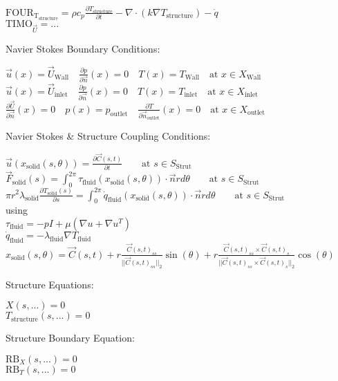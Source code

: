 \documentclass[10pt]{article} %
\begin{document}
\begin{center}
	$\text{FOUR}_{\text{T}_{\text{structure}}} = \rho c_p \frac{\partial T_{\text{structure}}}{\partial t} - \nabla \cdot (k\nabla T_{\text{structure}}) - \dot q$\\
	$\text{TIMO}_{\vec{U}} = ...$\\
\begin{flushleft}
	Navier Stokes Boundary Conditions:
\end{flushleft}
	$\vec{u}(x)=\vec{U}_{\text{Wall}} \quad \frac{\partial p}{\partial \vec{n}}(x)=0 \quad  T(x) = T_{\text{Wall}} \quad  \text{at } x \in X_{\text{Wall}}$\\
	$\vec{u}(x)=\vec{U}_{\text{inlet}} \quad \frac{\partial p}{\partial \vec{n}}(x)=0 \quad  T(x) = T_{\text{inlet}} \quad \text{at } x \in X_{\text{inlet}}$\\
	$\frac{\partial \vec{U}}{\partial \vec{n}}(x) = 0\quad p(x)=p_{\text{outlet}} \quad  \frac{\partial T}{\partial \vec{n}_{\text{outlet}}}(x) = 0 \quad \text{at } x \in X_{\text{outlet}}$\\
\begin{flushleft}
	Navier Stokes \& Structure Coupling Conditions:
\end{flushleft}
	$\vec{u}(x_{\text{solid}}\left(s,\theta\right))= \frac{\partial \vec{C}(s,t)}{\partial t} \quad \quad \text{at } s \in S_{\text{Strut}}$\\
	$ \vec{F}_{\text{solid}}(s) = \int_0^{2\pi} \tau_{\text{fluid}}(x_{\text{solid}}(s,\theta)) \cdot \vec{n} r d\theta \quad  \quad \text{at } s \in S_{\text{Strut}}$\\
	$ \pi r^2 \lambda_{\text{solid}} \frac{\partial T_{\text{solid}}(s)}{\partial s} = \int_0^{2\pi} \dot q_{\text{fluid}}(x_{\text{solid}}(s,\theta)) \cdot \vec{n} r d\theta \quad  \quad \text{at } s \in S_{\text{Strut}}$\\
	using\\
	$\tau_{\text{fluid}} = - p I + \mu \left(\nabla u + \nabla u ^T\right)$\\
	$\dot q_{\text{fluid}} = - \lambda_{\text{fluid}} \nabla T_{\text{fluid}}$\\
	$x_{\text{solid}}\left(s,\theta\right) = \vec{C}(s,t) + r\frac{\vec{C}(s,t)_{ss}}{\lvert \lvert \vec{C}(s,t)_{ss} \lvert \lvert_2}\sin(\theta) + r\frac{\vec{C}(s,t)_{ss} \times \vec{C}(s,t)_{s}}{\lvert \lvert \vec{C}(s,t)_{ss} \times \vec{C}(s,t)_{s} \lvert \lvert_2}\cos(\theta) $\\
\begin{flushleft}
	Structure Equations:
\end{flushleft}
	$X(s,...) = 0$\\
	$T_{\text{structure}}(s,...) =0$\\
\begin{flushleft}
	Structure Boundary Equation:
\end{flushleft}
	$\text{RB}_X(s,...) = 0$\\
	$\text{RB}_T(s,...) =0$\\
\end{center}
\end{document}
